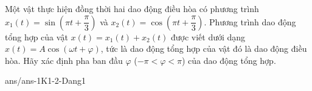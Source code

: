 \begin{ex}%
	Một vật thực hiện đồng thời hai dao động điều hòa có phương trình $x_1(t) = \sin \left(\pi t+\dfrac{\pi}{3}\right)$ và $x_2(t) = \cos \left(\pi t+\dfrac{\pi}{3}\right)$. Phương trình dao động tổng hợp của vật $x(t) = x_1(t)+x_2(t)$ được viết dưới dạng $x(t) = A\cos (\omega t + \varphi)$, tức là dao động tổng hợp của vật đó là dao động điều hòa. Hãy xác định pha ban đầu $\varphi$ ($-\pi<\varphi<\pi$) của dao động tổng hợp.
\end{ex}
\begin{indapan}{10}
	{ans/ans-1K1-2-Dang1}
\end{indapan}